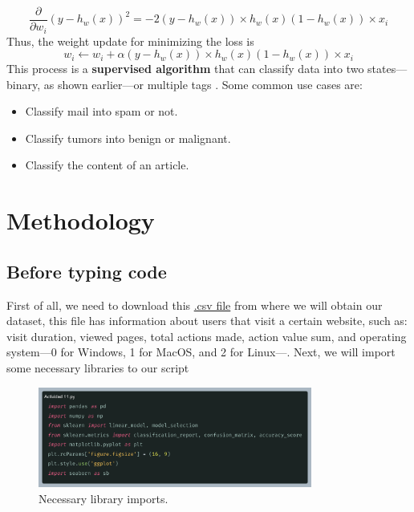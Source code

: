 \documentclass[10pt]{article}
\begin{document}
\begin{equation*}
  \frac{\partial}{\partial w_{i}}(y - h_{w}(x))^{2} = -2(y - h_{w}(x)) \times h_{w}(x)(1 - h_{w}(x)) \times x_{i}
\end{equation*}
Thus, the weight update for minimizing the loss is
\begin{equation*}
  w_{i} \leftarrow w_{i} + \alpha(y - h_{w}(x)) \times h_{w}(x)(1 - h_{w}(x)) \times x_{i}
\end{equation*}
This process is a \textbf{supervised algorithm} that can classify data into two states---binary, as shown earlier---or multiple tags \cite{aprendeML}. Some common use cases are:
\begin{itemize}
  \item Classify mail into spam or not.
  \item Classify tumors into benign or malignant.
  \item Classify the content of an article.
\end{itemize}

\section{Methodology}
\subsection{Before typing code} \label{sub:beforeanycode}
First of all, we need to download this \href{http://www.aprendemachinelearning.com/wp-content/uploads/2017/11/usuarios_win_mac_lin.csv}{.csv file} \cite{aprendeML} from where we will obtain our dataset, this file has information about users that visit a certain website, such as: visit duration, viewed pages, total actions made, action value sum, and operating system---0 for Windows, 1 for MacOS, and 2 for Linux---. Next, we will import some necessary libraries to our script
\begin{figure}[h]
  \centering
  \includegraphics[width=90mm]{./images/2025-03-28-08-55-18.png}
  \caption{Necessary library imports.}
\end{figure}
\end{document}
